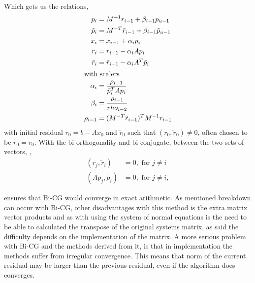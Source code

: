 \noindent Which gets us the relations,
\begin{align*}
    p_i&=M^{-1}r_{i-1}+\beta_{i-1}p_{u-1}\\
    \tilde{p}_i&=M^{-T}\tilde{r}_{i-1}+\beta_{i-1}\tilde{p}_{u-1}\\
    x_i&=x_{i-1}+\alpha_ip_i\\
    r_i&=r_{i-1}-\alpha_iAp_i\\
    \tilde{r}_i&=\tilde{r}_{i-1}-\alpha_iA^T\tilde{p}_i\\
\intertext{with scalers}
    \alpha_i&=\frac{\rho_{i-1}}{\tilde{p}^T_i A p_i} \\
    \beta_i&=\frac{\rho_{i-1}}{rho_{i-2}}\\
    \rho_{i-1}&=(M^{-T}\tilde{r}_{i-1})^TM^{-1}r_{i-1}
\end{align*}
with initial residual \(r_0=b-Ax_0\) and \(\tilde{r}_0\) such that \((r_0, \tilde{r}_0)\ne0\), often chosen to be \(\tilde{r}_0=r_0\). With the bi-orthogonality and bi-conjugate, between the two sets of vectors, \cite{Saad2003},
\begin{align}
    (r_j, \tilde{r}_i)&=0, \text{ for } j\ne i\label{eq: BiCG orthogonal}\\
    (Ap_j, \tilde{p}_i)&=0, \text{ for } j\ne i,
\end{align}

\noindent ensures that Bi-CG would converge in exact arithmetic. As mentioned breakdown can occur with Bi-CG, other disadvantages with this method is the extra matrix vector products and as with using the system of normal equations is the need to be able to calculated the transpose of the original systems matrix, as said the difficulty depends on the implementation of the matrix. A more serious problem with Bi-CG and the methods derived from it, is that in implementation the methods suffer from irregular convergence. This means that norm of the current residual may be larger than the previous residual, even if the algorithm does converges.